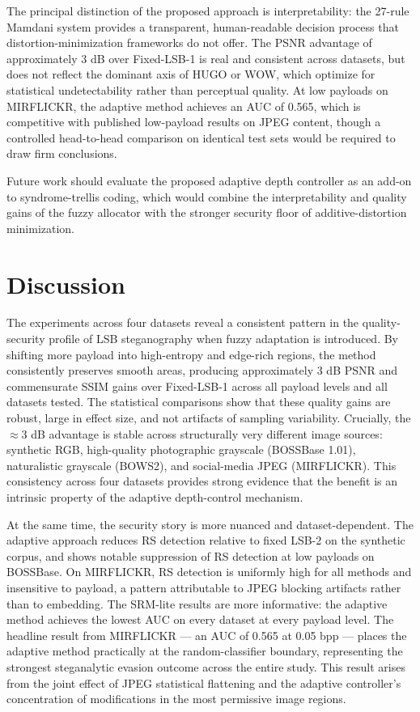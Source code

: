The principal distinction of the proposed approach is interpretability: the 27-rule Mamdani system provides a transparent, human-readable decision process that distortion-minimization frameworks do not offer. The PSNR advantage of approximately 3 dB over Fixed-LSB-1 is real and consistent across datasets, but does not reflect the dominant axis of HUGO or WOW, which optimize for statistical undetectability rather than perceptual quality. At low payloads on MIRFLICKR, the adaptive method achieves an AUC of 0.565, which is competitive with published low-payload results on JPEG content, though a controlled head-to-head comparison on identical test sets would be required to draw firm conclusions.

Future work should evaluate the proposed adaptive depth controller as an add-on to syndrome-trellis coding, which would combine the interpretability and quality gains of the fuzzy allocator with the stronger security floor of additive-distortion minimization.

\section{Discussion}
The experiments across four datasets reveal a consistent pattern in the quality-security profile of LSB steganography when fuzzy adaptation is introduced. By shifting more payload into high-entropy and edge-rich regions, the method consistently preserves smooth areas, producing approximately 3 dB PSNR and commensurate SSIM gains over Fixed-LSB-1 across all payload levels and all datasets tested. The statistical comparisons show that these quality gains are robust, large in effect size, and not artifacts of sampling variability. Crucially, the $\approx$3 dB advantage is stable across structurally very different image sources: synthetic RGB, high-quality photographic grayscale (BOSSBase 1.01), naturalistic grayscale (BOWS2), and social-media JPEG (MIRFLICKR). This consistency across four datasets provides strong evidence that the benefit is an intrinsic property of the adaptive depth-control mechanism.

At the same time, the security story is more nuanced and dataset-dependent. The adaptive approach reduces RS detection relative to fixed LSB-2 on the synthetic corpus, and shows notable suppression of RS detection at low payloads on BOSSBase. On MIRFLICKR, RS detection is uniformly high for all methods and insensitive to payload, a pattern attributable to JPEG blocking artifacts rather than to embedding. The SRM-lite results are more informative: the adaptive method achieves the lowest AUC on every dataset at every payload level. The headline result from MIRFLICKR --- an AUC of 0.565 at 0.05 bpp --- places the adaptive method practically at the random-classifier boundary, representing the strongest steganalytic evasion outcome across the entire study. This result arises from the joint effect of JPEG statistical flattening and the adaptive controller's concentration of modifications in the most permissive image regions.

